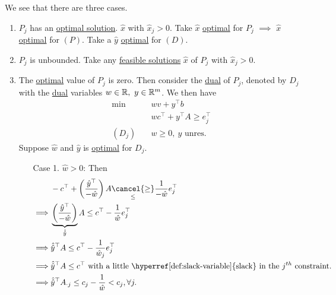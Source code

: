 \begin{explanation}
	We see that there are three cases.
	\begin{enumerate}
		\item \(P_{j}\) has an \hyperref[def:optimal-solution]{optimal solution}. \(\hat{x}\) with \(\hat{x}_j>0\). Take \(\hat{x}\) \hyperref[def:optimal-solution]{optimal}
		      for \(P_{j}\) \(\implies\) \(\hat{x}\) \hyperref[def:optimal-solution]{optimal} for \((P)\). Take a \(\hat{y}\) \hyperref[def:optimal-solution]{optimal} for \((D)\).
		\item \(P_{j}\) is unbounded. Take any \hyperref[def:feasible-solution]{feasible solutions} \(\hat{x}\) of \(P_{j}\) with \(\hat{x}_j>0\).
		\item The \hyperref[def:optimal-solution]{optimal} value of \(P_{j}\) is zero. Then consider the \hyperref[def:dual]{dual} of \(P_{j}\),
		      denoted by \(D_{j}\) with the \hyperref[def:dual]{dual} variables \(w\in\mathbb{\MakeUppercase{R}},\ y\in\mathbb{\MakeUppercase{R}}^m\).
		      We then have
		      \[
			      \begin{aligned}
				      \min~        & wv + y^{\top}b                        \\
				                   & wc^{\top}+y^{\top}A \geq e_{j}^{\top} \\
				      (D_{j})\quad & w\geq 0,\ y \text{ unres.}
			      \end{aligned}
		      \]
		      Suppose \(\hat{w}\) and \(\hat{y}\) is \hyperref[def:optimal-solution]{optimal} for \(D_{j}\).
		      \begin{enumerate}
			      \item[Case 1.] \(\hat{w}>0\): Then
				      \[
					      \begin{split}
						      &-c^{\top} + \left( \frac{\hat{y}^{\top}}{-\hat{w}} \right)A\underset{\leq }{\cancel{\geq}} \frac{1}{-\hat{w}} e_{j}^{\top}\\
						      \implies&\underbrace{\left( \frac{\hat{y}^{\top}}{-\hat{w}} \right)}_{\hat{\hat{y}}} A\leq c^{\top} -  \frac{1}{\hat{w}} e_{j}^{\top}\\
						      \implies&\hat{\hat{y}}^{\top}A\leq c^{\top} - \frac{1}{\hat{w}_j}e_{j}^{\top}\\
						      \implies&\hat{\hat{y}}^{\top}A\leq c^{\top} \text{ with a little \hyperref[def:slack-variable]{slack} in the \(j^{th}\) constraint.}\\
						      \implies&\hat{\hat{y}}^{\top}A_{\cdot j}\leq c_{j} - \frac{1}{\hat{w}}<c_{j}, \forall j.
					      \end{split}
				      \]

\end{enumerate}
\end{enumerate}
\end{explanation}
